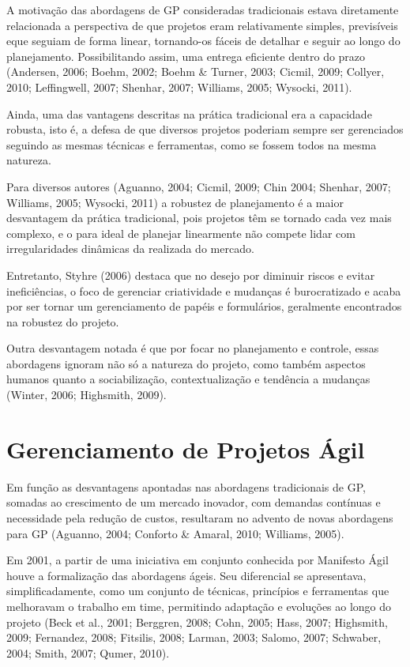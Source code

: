 A motivação das abordagens de GP consideradas tradicionais estava diretamente relacionada a perspectiva de que projetos eram relativamente simples, previsíveis eque seguiam de forma linear, tornando-os fáceis de detalhar e seguir ao longo do planejamento. Possibilitando assim, uma entrega eficiente dentro do prazo (Andersen, 2006; Boehm, 2002; Boehm \& Turner, 2003; Cicmil, 2009; Collyer, 2010; Leffingwell, 2007; Shenhar, 2007; Williams, 2005; Wysocki, 2011).

Ainda, uma das vantagens descritas na prática tradicional era a capacidade robusta, isto é, a defesa de que diversos projetos poderiam sempre ser gerenciados seguindo as mesmas técnicas e ferramentas, como se fossem todos na mesma natureza.

Para diversos autores (Aguanno, 2004; Cicmil, 2009; Chin 2004; Shenhar, 2007; Williams, 2005; Wysocki, 2011) a robustez de planejamento é a maior desvantagem da prática tradicional, pois projetos têm se tornado cada vez mais complexo, e o para ideal de planejar linearmente não compete lidar com irregularidades dinâmicas da realizada do mercado.

Entretanto, Styhre (2006) destaca que no desejo por diminuir riscos e evitar ineficiências, o foco de gerenciar criatividade e mudanças é burocratizado e acaba por ser tornar um gerenciamento de papéis e formulários, geralmente encontrados na robustez do projeto.

Outra desvantagem notada é que por focar no planejamento e controle, essas abordagens ignoram não só a natureza do projeto, como também aspectos humanos quanto a sociabilização, contextualização e tendência a mudanças (Winter, 2006; Highsmith, 2009).


\section{Gerenciamento de Projetos Ágil}
Em função as desvantagens apontadas nas abordagens tradicionais de GP, somadas ao crescimento de um mercado inovador, com demandas contínuas e necessidade pela redução de custos, resultaram no advento de novas abordagens para GP (Aguanno, 2004; Conforto \& Amaral, 2010; Williams, 2005).

Em 2001, a partir de uma iniciativa em conjunto conhecida por Manifesto Ágil houve a formalização das abordagens ágeis. Seu diferencial se apresentava, simplificadamente, como um conjunto de técnicas, princípios e ferramentas que melhoravam o trabalho em time, permitindo adaptação e evoluções ao longo do projeto (Beck et al., 2001; Berggren, 2008; Cohn, 2005; Hass, 2007; Highsmith, 2009; Fernandez, 2008; Fitsilis, 2008; Larman, 2003; Salomo, 2007; Schwaber, 2004; Smith, 2007; Qumer, 2010).

